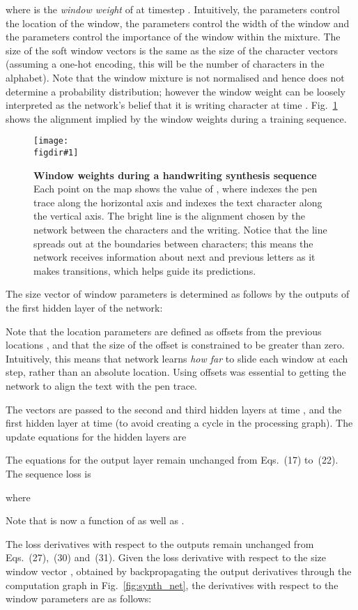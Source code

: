 \documentclass{article}
\newcommand{\flabel}[1]{\label{fig:#1}}
\newcommand{\fref}[1]{Fig.~\ref{fig:#1}}
\newcommand{\figdir}{}
\newcommand{\capt}[2]{\caption[#1]{\textbf{#1}#2}}
\newcommand{\fig}[5]
{
\begin{figure}
\begin{center}
\texttt{[image: \\figdir\#1]}
\end{center}
\capt{#4}{#5}
\flabel{#2}
\end{figure}
}
\begin{document}
where  is the \emph{window weight} of  at timestep .
Intuitively, the  parameters control the location of the window, the  parameters control the width of the window and the  parameters control the importance of the window within the mixture.
The size of the soft window vectors is the same as the size of the character vectors  (assuming a one-hot encoding, this will be the number of characters in the alphabet).
Note that the window mixture is not normalised and hence does not determine a probability distribution; however the window weight  can be loosely interpreted as the network's belief that it is writing character  at time .
\fref{window_weights} shows the alignment implied by the window weights during a training sequence.

\fig{window_weights}{window_weights}{1}{Window weights during a handwriting synthesis sequence}{ Each point on the map shows the value of , where  indexes the pen trace along the horizontal axis and  indexes the text character along the vertical axis. The bright line is the alignment chosen by the network between the characters and the writing. Notice that the line spreads out at the boundaries between characters; this means the network receives information about next and previous letters as it makes transitions, which helps guide its predictions.}

The size  vector  of window parameters is determined as follows by the outputs of the first hidden layer of the network:

Note that the location parameters  are defined as offsets from the previous locations , and that the size of the offset is constrained to be greater than zero.
Intuitively, this means that network learns \emph{how far} to slide each window at each step, rather than an absolute location.
Using offsets was essential to getting the network to align the text with the pen trace.

The  vectors are passed to the second and third hidden layers at time , and the first hidden layer at time  (to avoid creating a cycle in the processing graph).
The update equations for the hidden layers are

The equations for the output layer remain unchanged from Eqs.~(17) to~(22).
The sequence loss is

where

Note that  is now a function of  as well as .

The loss derivatives with respect to the outputs  remain unchanged from Eqs.~(27),~(30) and~(31).
Given the loss derivative  with respect to the size  window vector , obtained by backpropagating the output derivatives through the computation graph in \fref{synth_net}, the derivatives with respect to the window parameters are as follows:
\end{document}
